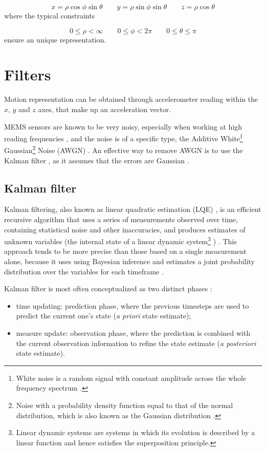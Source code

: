 \[
	x = \rho \cos\phi \sin\theta \quad\quad y = \rho \sin\phi \sin\theta \quad\quad  z = \rho \cos\theta
\]
where the typical constraints

\[
	0 \leq \rho < \infty \quad\quad 0 \leq \phi < 2\pi \quad\quad 0 \leq \theta \leq \pi
\]
ensure an unique representation.

\section{Filters}
Motion representation can be obtained through accelerometer reading within the $x$, $y$ and $z$ axes, that make up an acceleration vector.

MEMS sensors are known to be very noisy, especially when working at high reading frequencies \cite[7]{Mat08}, and the noise is of a specific type, the Additive White\footnote{White noise is a random signal with constant amplitude across the whole frequency spectrum \cite{Feh97}.} Gaussian\footnote{Noise with a probability density function equal to that of the normal distribution, which is also known as the Gaussian distribution \cite{Feh97}.} Noise (AWGN) \cite{Yas03}. An effective way to remove AWGN is to use the Kalman filter \cite{Ko07, Sär15}, as it assumes that the errors are Gaussian \cite{Kal60}.

\subsection{Kalman filter}
Kalman filtering, also known as linear quadratic estimation (LQE) \cite{Ma19}, is an efficient recursive algorithm that uses a series of measurements observed over time, containing statistical noise and other inaccuracies, and produces estimates of unknown variables (the internal state of a linear dynamic system\footnote{Linear dynamic systems are systems in which its evolution is described by a linear function and hence satisfies the superposition principle.} \cite[47]{Ma19}) \cite[7-8]{Ma19}. This approach tends to be more precise than those based on a single measurement alone, because it uses using Bayesian inference and estimates a joint probability distribution over the variables for each timeframe \cite[8]{Ma19}.

Kalman filter is most often conceptualized as two distinct phases \cite[12-13]{Ma19}:

\begin{itemize}
	\item time updating: prediction phase, where the previous timesteps are used to predict the current one's state (\textit{a priori} state estimate);
	\item measure update: observation phase, where the prediction is combined with the current observation information to refine the state estimate (\textit{a posteriori} state estimate).
\end{itemize}

